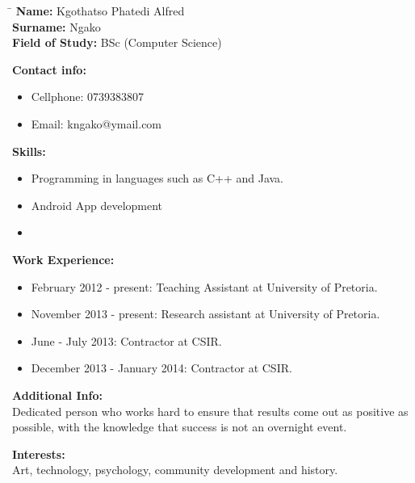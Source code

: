 \documentclass[12pt]{article}
\begin{document}
	\begin{flushleft}
		\begin{tabbing}
			\hspace*{4cm}\=\hspace*{3cm}\kill
			\textbf{Name:} \> Kgothatso Phatedi Alfred \\	
			\textbf{Surname:} \> Ngako \\
			\textbf{Field of Study:} \> BSc (Computer Science)
		\end{tabbing}
		
		\textbf{Contact info:}	
		\begin{itemize}
			\item Cellphone: 0739383807
			\item Email: kngako@ymail.com
		\end{itemize}
		
	
	
		\textbf{Skills:}
		\begin{itemize}
			\item Programming in languages such as C++ and Java.
			\item Android App development
			\item 
		\end{itemize}
	
		\textbf{Work Experience:}
		\begin{itemize}
			\item February 2012 - present: Teaching Assistant at University of Pretoria.
			\item November 2013 - present: Research assistant at University of Pretoria.
			\item June - July 2013: Contractor at CSIR.
			\item December 2013 - January 2014: Contractor at CSIR.
		\end{itemize}
	
		\textbf{Additional Info:} \\
		\vspace{0.1in}
	 	Dedicated person who works hard to ensure that results come out as positive as possible, with the knowledge that success is not an overnight event.\\
		\vspace{0.1in}
		
		\textbf{Interests:} \\
		\vspace{0.1in}
	 	Art, technology, psychology, community development and history.  \\
	 	\vspace{0.1in}
	\end{flushleft}
\end{document}
